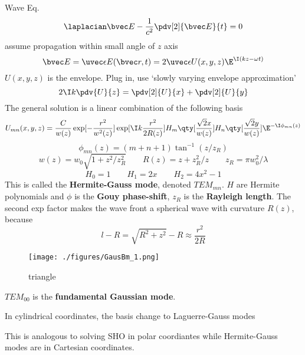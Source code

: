 
Wave Eq.
\begin{equation}
\laplacian \bvec E - \frac{1}{c^2} \pdv[2]{\bvec E}{t} = 0
\end{equation}
assume propagation within small angle of $z$ axis
\begin{equation}
\bvec E = \uvec \epsilon E(\bvec r, t) = 2\uvec \epsilon U(x, y, z) \E^{\I (kz - \omega t)}
\end{equation}
$U(x, y, z)$ is the envelope. Plug in, use ‘slowly varying envelope approximation’
\begin{equation}
2\I k\pdv{U}{z} = \pdv[2]{U}{x} + \pdv[2]{U}{y}
\end{equation}
The general solution is a linear combination of the following basis
\begin{equation}
U_{mn}(x, y, z) = \frac{C}{w(z)} \exp[-\frac{r^2}{w^2(z)}]\exp[\I k\frac{r^2}{2R(z)}] H_m\qty[\frac{\sqrt{2}x}{w(z)}] H_n \qty[\frac{\sqrt{2} y}{w(z)}] \E^{-\I \phi_{mn}(z)}
\end{equation}
\begin{equation}
\phi_{mn}(z) = (m+n+1)\tan^{-1}(z/z_R)
\end{equation}
\begin{equation}
w(z) = w_0\sqrt{1 + z^2/z_R^2}
\qquad
R(z) = z + z_R^2 / z
\qquad
z_R = \pi w_0^2 / \lambda
\end{equation}
\begin{equation}
H_0 = 1 \qquad H_1 = 2x \qquad H_2 = 4x^2 - 1
\end{equation}
This is called the \textbf{Hermite-Gauss mode}, denoted $TEM_{mn}$. $H$ are Hermite polynomials and $\phi$ is the \textbf{Gouy phase-shift}, $z_R$ is the \textbf{Rayleigh length}. The second exp factor makes the wave front a spherical wave with curvature $R(z)$, because
\begin{equation}
l - R = \sqrt{R^2 + z^2} - R \approx \frac{r^2}{2R}
\end{equation}

\begin{figure}[ht]
\centering
\texttt{[image: ./figures/GausBm\_1.png]}
\caption{triangle} \label{GausBm_fig1}
\end{figure}

$TEM_{00}$ is the \textbf{fundamental Gaussian mode}.

In cylindrical coordinates, the basis change to Laguerre-Gauss modes  
 
  
This is analogous to solving SHO in polar coordiantes while Hermite-Gauss modes are in Cartesian coordinates. 
